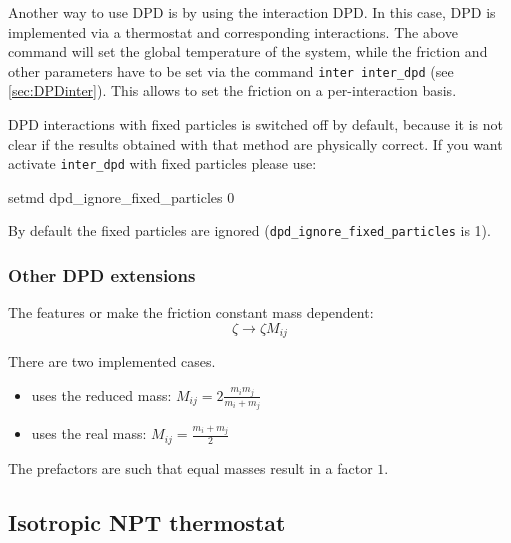 Another way to use DPD is by using the interaction DPD. In this case,
DPD is implemented via a thermostat and corresponding interactions.
The above command will set the global temperature of the system, while
the friction and other parameters have to be set via the command
\texttt{inter inter_dpd} (see \vref{sec:DPDinter}).  This allows to
set the friction on a per-interaction basis.

DPD interactions with fixed particles is switched off by default, because
it is not clear if the results obtained with that method are physically 
correct. If you want activate \texttt{inter_dpd} with fixed particles please 
use:
\begin{essyntax}
  setmd dpd_ignore_fixed_particles 0
  \begin{features}
  \end{features}
\end{essyntax}
By default the fixed particles are ignored (\texttt{dpd_ignore_fixed_particles} is 1).

\subsubsection{Other DPD extensions}

The features  or  make the
friction constant mass dependent:
\begin{equation*}
\zeta \to \zeta M_{ij}
\end{equation*}

\noindent There are two implemented cases. 
\begin{itemize}
\item {} uses the reduced mass: $M_{ij}=2\frac{m_i
    m_j}{m_i+m_j}$
\item {} uses the real mass:
  $M_{ij}=\frac{m_i+m_j}{2}$
\end{itemize}
The prefactors are such that equal masses
result in a factor $1$.

\subsection{Isotropic NPT thermostat}
\label{ssec:NPTthermostat}

\begin{pysyntax}
\end{pysyntax}


